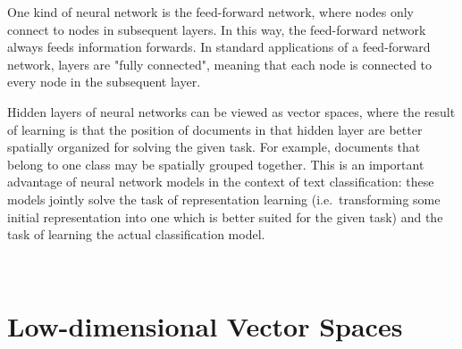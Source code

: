 One kind of neural network is the feed-forward network, where nodes only connect to nodes in subsequent layers. In this way, the feed-forward network always feeds information forwards. In standard applications of a feed-forward network, layers are "fully connected", meaning that each node is connected to every node in the subsequent layer. 

Hidden layers of neural networks can be viewed as vector spaces, where the result of learning is that the position of documents in that hidden layer are better spatially organized for solving the given task. For example, documents that belong to one class may be spatially grouped together. This is an important advantage of neural network models in the context of text classification: these models jointly solve the task of representation learning (i.e.\ transforming some initial representation into one which is better suited for the given task) and the task of learning the actual classification model.



\

\section{Low-dimensional Vector Spaces}\label{ch2:vectorspaces}




